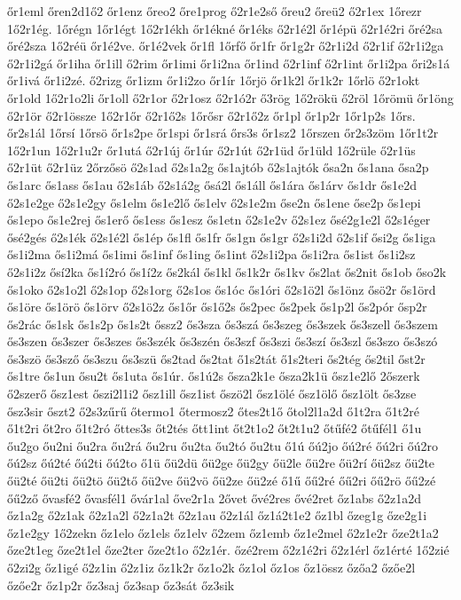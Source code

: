 {őr1eml
őren2d1ő2
őr1enz
őreo2
őre1prog
ő2r1e2ső
őreu2
őreü2
ő2r1ex
1őrezr
1ő2r1ég.
1őrégn
1őr1égt
1ő2r1ékh
őr1ékné
őr1éks
ő2r1é2l
őr1épü
ő2r1é2ri
őré2sa
őré2sza
1ő2réü
őr1é2ve.
őr1é2vek
őr1fl
1őrfő
őr1fr
őr1g2r
ő2r1i2d
ő2r1if
ő2r1i2ga
ő2r1i2gá
őr1iha
őr1ill
ő2rim
őr1imi
őr1i2na
őr1ind
ő2r1inf
ő2r1int
őr1i2pa
őri2s1á
őr1ivá
őr1i2zé.
ő2rizg
őr1izm
őr1i2zo
őr1ír
1őrjö
őr1k2l
őr1k2r
1őrlö
ő2r1okt
őr1old
1ő2r1o2li
őr1oll
ő2r1or
ő2r1osz
ő2r1ó2r
ő3rög
1ő2rökü
ő2röl
1őrömü
őr1öng
ő2r1ör
ő2r1össze
1ő2r1őr
ő2r1ő2s
1őrősr
ő2r1ő2z
őr1pl
őr1p2r
1őr1p2s
1őrs.
őr2s1ál
1őrsí
1őrsö
őr1s2pe
őr1spi
őr1srá
őrs3s
őr1sz2
1őrszen
őr2s3zöm
1őr1t2r
1ő2r1un
1ő2r1u2r
őr1utá
ő2r1új
őr1úr
ő2r1út
ő2r1üd
őr1üld
1ő2rüle
ő2r1üs
ő2r1üt
ő2r1üz
2őrzősö
ő2s1ad
ő2s1a2g
ős1ajtób
ő2s1ajtók
ősa2n
ős1ana
ősa2p
ős1arc
ős1ass
ős1au
ő2s1áb
ő2s1á2g
ősá2l
ős1áll
ős1ára
ős1árv
ős1dr
ős1e2d
ő2s1e2ge
ő2s1e2gy
ős1elm
ős1e2lő
ős1elv
ő2s1e2m
őse2n
ős1ene
őse2p
ős1epi
ős1epo
ős1e2rej
ős1erő
ős1ess
ős1esz
ős1etn
ő2s1e2v
ő2s1ez
ősé2g1e2l
ő2s1éger
ősé2gés
ő2s1ék
ő2s1é2l
ős1ép
ős1fl
ős1fr
ős1gn
ős1gr
ő2s1i2d
ő2s1if
ősi2g
ős1iga
ős1i2ma
ős1i2má
ős1imi
ős1inf
ős1ing
ős1int
ő2s1i2pa
ős1i2ra
ős1ist
ős1i2sz
ő2s1i2z
ősí2ka
ős1í2ró
ős1í2z
ős2kál
ős1kl
ős1k2r
ős1kv
ős2lat
ős2nit
ős1ob
őso2k
ős1oko
ő2s1o2l
ő2s1op
ő2s1org
ő2s1os
ős1óc
ős1óri
ő2s1ö2l
ős1önz
ősö2r
ős1örd
ős1öre
ős1örö
ős1örv
ő2s1ö2z
ős1őr
ős1ő2s
ős2pec
ős2pek
ős1p2l
ős2pór
ősp2r
ős2rác
ős1sk
ős1s2p
ős1s2t
őssz2
ős3sza
ős3szá
ős3szeg
ős3szek
ős3szell
ős3szem
ős3szen
ős3szer
ős3szes
ős3szék
ős3szén
ős3szf
ős3szi
ős3szí
ős3szl
ős3szo
ős3szó
ős3szö
ős3sző
ős3szu
ős3szü
ős2tad
ős2tat
ő1s2tát
ő1s2teri
ős2tég
ős2til
őst2r
ős1tre
ős1un
ősu2t
ős1uta
ős1úr.
ős1ú2s
ősza2k1e
ősza2k1ü
ősz1e2lő
2őszerk
ő2szerő
ősz1est
őszi2l1i2
ősz1ill
ősz1ist
őszö2l
ősz1ölé
ősz1ölő
ősz1ölt
ős3zse
ősz3sir
őszt2
ő2s3zűrű
őtermo1
őtermosz2
őtes2t1ő
őtol2l1a2d
ő1t2ra
ő1t2ré
ő1t2ri
őt2ro
ő1t2ró
őttes3s
őt2tés
őtt1int
őt2t1o2
őt2t1u2
őtűfé2
őtűfél1
ő1u
őu2go
őu2ni
őu2ra
őu2rá
őu2ru
őu2ta
őu2tó
őu2tu
ő1ú
őú2jo
őú2ré
őú2ri
őú2ro
őú2sz
őú2té
őú2ti
őú2to
ő1ü
őü2dü
őü2ge
őü2gy
őü2le
őü2re
őü2rí
őü2sz
őü2te
őü2té
őü2ti
őü2tö
őü2tő
őü2ve
őü2vö
őü2ze
őü2zé
ő1ű
őű2ré
őű2ri
őű2rö
őű2zé
őű2ző
ővasfé2
ővasfél1
ővár1al
őve2r1a
2ővet
ővé2res
ővé2ret
őz1abs
ő2z1a2d
őz1a2g
ő2z1ak
ő2z1a2l
ő2z1a2t
ő2z1au
ő2z1ál
őz1á2t1e2
őz1bl
őzeg1g
őze2g1i
őz1e2gy
1ő2zekn
őz1elo
őz1els
őz1elv
ő2zem
őz1emb
őz1e2mel
ő2z1e2r
őze2t1a2
őze2t1eg
őze2t1el
őze2ter
őze2t1o
ő2z1ér.
őzé2rem
ő2z1é2ri
ő2z1érl
őz1érté
1ő2zié
ő2zi2g
őz1igé
ő2z1in
ő2z1iz
őz1k2r
őz1o2k
őz1ol
őz1os
őz1össz
őzőa2
őzőe2l
őzőe2r
őz1p2r
őz3saj
őz3sap
őz3sát
őz3sik
}
